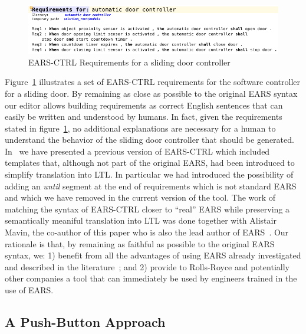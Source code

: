 \vspace{-.5cm} \begin{figure}[h!]
   \begin{center}
     \includegraphics[width=.9\textwidth]{images/EARS-Reqs.png}
     \vspace{-.3cm}
     \caption{\textsf{EARS-CTRL} Requirements for a sliding door
     controller} 
     \label{fig:ears_reqs}
   \end{center} 
 \end{figure}
\vspace{-1cm}Figure~\ref{fig:ears_reqs} illustrates a set of \textsf{EARS-CTRL}
requirements for the software controller for a sliding door. By remaining as close as
possible to the original EARS syntax our editor allows building requirements as
correct English sentences that can easily be written and understood by humans.
In fact, given the requirements stated in figure~\ref{fig:ears_reqs}, no
additional explanations are necessary for a human to understand the behavior of
the sliding door controller that should be generated. In~\cite{LucioRCM17} we
have presented a previous version of \textsf{EARS-CTRL} which included templates
that, although not part of the original EARS, had been introduced to simplify
translation into LTL. In particular we had introduced the possibility of adding
an \emph{until} segment at the end of requirements which is not standard EARS
and which we have removed in the current version of the tool.
The work of matching the syntax of \textsf{EARS-CTRL} closer to ``real'' EARS
while preserving a semantically meaniful translation into LTL was done together with Alistair Mavin, the
co-author of this paper who is also the lead author of EARS~\cite{EARS09}.
Our rationale is that, by remaining as faithful as possible to the original EARS
syntax, we: 1) benefit from all the advantages of using EARS already
investigated and described in the literature~\cite{EARS09,EARS16}; and 2)
provide to Rolls-Royce and potentially other companies a tool that can
immediately be used by engineers trained in the use of EARS.\vspace{-.5cm}

\subsection{A Push-Button Approach}

